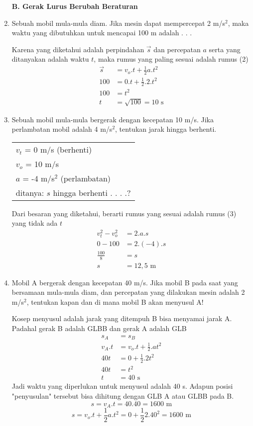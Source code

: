 \documentclass[10pt,a4paper]{article}
\newcommand{\unhide}[1]{
\begin{mybox}
#1\end{mybox}}
\begin{document}
\begin{multicols*}{2}
\begin{enumerate}[topsep=0pt,itemsep=0pt,leftmargin=*]
\textbf{B. Gerak Lurus Berubah Beraturan}
\item Sebuah mobil mula-mula diam. Jika mesin dapat mempercepat 2 m/s$^2$, maka waktu yang dibutuhkan untuk mencapai 100 m adalah . . . 
\unhide{
Karena yang diketahui adalah perpindahan $\vec{s}$ dan percepatan $a$ serta yang ditanyakan adalah waktu $t$, maka rumus yang paling sesuai adalah rumus (2)
\begin{align*}
\vec{s}&=v_o.t+\frac{1}{2}a.t^2\\
100 &= 0.t + \frac{1}{2}.2.t^2\\
100 &= t^2\\
t&=\sqrt{100} = 10 \text{ s}
\end{align*}}

\item Sebuah mobil mula-mula bergerak dengan kecepatan 10 m/s. Jika perlambatan mobil adalah 4 m/s$^2$, tentukan jarak hingga berhenti.
\unhide{
\begin{tabular}{l}
$v_t$ = 0 m/s (berhenti)\\
$v_o$ = 10 m/s\\
$a$ = -4 m/s$^2$ (perlambatan)\\
ditanya: $s$ hingga berhenti . . . .?\\
\end{tabular}
Dari besaran yang diketahui, berarti rumus yang sesuai adalah rumus (3) yang tidak ada $t$
\begin{align*}
v_t^2-v_o^2 &= 2.a.s\\
0-100 &= 2.(-4).s\\
\frac{100}{8}&=s\\
s&=12,5 \text{ m}
\end{align*}
}  


\item Mobil A bergerak dengan kecepatan 40 m/s. Jika mobil B pada saat yang bersamaan mula-mula diam, dan percepatan yang dilakukan mesin adalah 2 m/s$^2$, tentukan kapan dan di mana mobil B akan menyusul A!
\unhide{
Kosep menyusul adalah jarak yang ditempuh B bisa menyamai jarak A. Padahal gerak B adalah GLBB dan gerak A adalah GLB
\begin{align*}
s_A &= s_B \\
v_A.t &= v_o.t+\frac{1}{2}.at^2\\
40t &= 0 + \frac{1}{2}.2t^2\\
40t &=t^2\\
t&=40 \text{ s} 
\end{align*}
Jadi waktu yang diperlukan untuk menyusul adalah 40 s. Adapun posisi "penyusulan" tersebut bisa dihitung dengan GLB A atau GLBB pada B.
$$s=v_A.t=40.40 =1600 \text{ m}$$
$$s=v_o.t+\frac{1}{2}a.t^2 = 0+\frac{1}{2}2.40^2 =1600 \text{ m}$$
}


\end{enumerate}
\end{multicols*}
\end{document}
